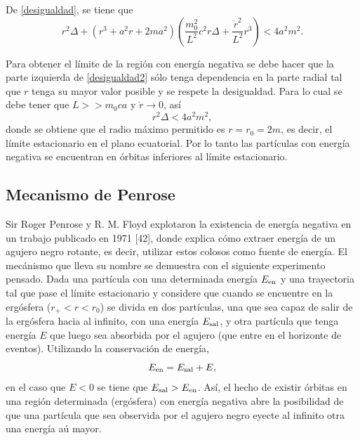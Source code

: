De \eqref{desigualdad}, se tiene que
\begin{equation}\label{desigualdad2}
r^2 \Delta +\left(r^3+a^2r+2ma^2\right)\left(\frac{m_0^2}{L^2}c^2r\Delta+\frac{\dot{r}^2}{L^2}r^3\right) < 4a^2m^2.
\end{equation}

Para obtener el l\'imite de la regi\'on con energ\'ia negativa se debe hacer que la parte izquierda de \eqref{desigualdad2} s\'olo tenga dependencia en la parte radial tal que $r$ tenga su mayor valor posible y se respete la desigualdad. Para lo cual se debe tener que $L>>m_0ca$ y $\dot{r} \rightarrow 0$, as\'i
\begin{equation}\label{desigualdad3}
r^2 \Delta < 4a^2m^2,
\end{equation}
donde se obtiene que el radio m\'aximo permitido es $r=r_0=2m$, es decir, el l\'imite estacionario en el plano ecuatorial. Por lo tanto las part\'iculas con energ\'ia negativa se encuentran en \'orbitas inferiores al l\'imite estacionario.\\

\subsection{Mecanismo de Penrose}

Sir Roger Penrose y R. M. Floyd explotaron  la existencia de energ\'ia negativa en un trabajo publicado en 1971 [42], donde explica c\'omo extraer energ\'ia de un agujero negro rotante, es decir, utilizar estos colosos como fuente de energ\'ia. El mec\'anismo que lleva su nombre se demuestra con el siguiente experimento pensado. Dada una part\'icula con una determinada energ\'ia $E_{\rm en}$ y una trayectoria tal que pase el l\'imite estacionario y considere que cuando se encuentre en la erg\'osfera ($r_+<r<r_0$) se divida en dos part\'iculas, una que sea capaz de salir de la erg\'osfera hacia al infinito, con una energ\'ia $E_{\rm sal}$, y otra part\'icula que tenga energ\'ia $E$ que luego sea absorbida por el agujero (que entre en el horizonte de eventos). Utilizando la conservaci\'on de energ\'ia,
\begin{equation}
E_{\rm en}=E_{\rm sal}+E,
\end{equation}
en el caso que $E<0$ se tiene que $E_{\rm sal}>E_{\rm en}$. As\'i, el hecho de existir \'orbitas en una regi\'on determinada (erg\'osfera) con energ\'ia negativa abre la posibilidad de que una part\'icula que sea observida por el agujero negro eyecte al infinito otra una energ\'ia a\'u mayor.\\

